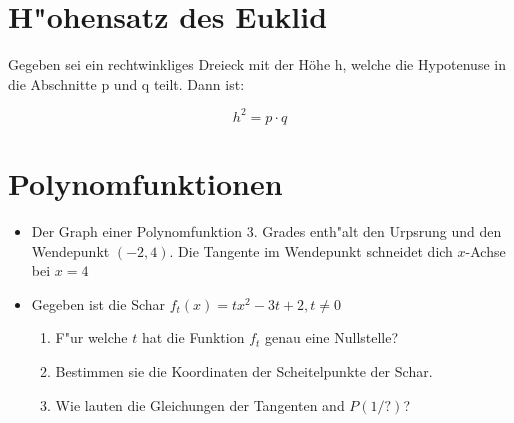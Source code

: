 \documentclass{article}
\begin{document}
\section{H"ohensatz des Euklid}

Gegeben sei ein rechtwinkliges Dreieck mit der Höhe h, welche die Hypotenuse in die Abschnitte p und q teilt. Dann ist:

\begin{equation}
h^2 = p\cdot q
\end{equation}

\section{Polynomfunktionen}
\begin{itemize}
\item Der Graph einer Polynomfunktion 3. Grades enth"alt den Urpsrung und den Wendepunkt \( (-2,4) \). Die Tangente im Wendepunkt schneidet dich \(x\)-Achse  bei \( x = 4\)
\item Gegeben ist die Schar \( f_t(x) = tx^2 - 3t + 2, t\neq 0 \) \begin{enumerate}
\item F"ur welche $t$ hat die Funktion $f_t$ genau eine Nullstelle?
\item Bestimmen sie die Koordinaten der Scheitelpunkte der Schar.
\item Wie lauten die Gleichungen der Tangenten and $P(1/?)$?
\end{enumerate}
\end{itemize}
\end{document}
